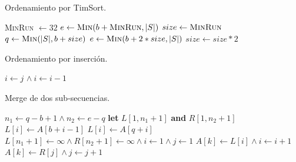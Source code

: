 \documentclass[letter]{article}
\begin{document}
\begin{algorithm}[!ht]
\caption{Ordenamiento por TimSort.}
\begin{algorithmic}[1]
  \State \textsc{MinRun} $\leftarrow 32$ 
    \State $e \leftarrow \Call{Min}{b + \textsc{MinRun}, |S|}$
    \State {}
  \EndFor
  \State $size \leftarrow \textsc{MinRun}$
      \State $q \leftarrow \Call{Min}{|S|, b+size}$
      \State $e \leftarrow \Call{Min}{b + 2 * size, |S|}$
        \State {}
      \EndIf
    \EndFor
    \State $size \leftarrow size * 2$
  \EndWhile
\EndProcedure
\end{algorithmic}
\end{algorithm}

\vspace{-1em}

\begin{algorithm}[!ht]
\caption{Ordenamiento por inserción.}
\begin{algorithmic}[1]
    \State $i \leftarrow j$
      \State {} $\land~ i \leftarrow i - 1$
    \EndWhile
  \EndFor
\EndProcedure
\end{algorithmic}
\end{algorithm}

\vspace{-1em}

\begin{algorithm}[!ht]
\caption{Merge de dos sub-secuencias.}
\begin{algorithmic}[1]
  \State $n_1 \leftarrow q - b + 1 \land n_2 \leftarrow e - q$
  \State \textbf{let} $L[1,n_1+1]$ \textbf{and} $R[1,n_2+1]$
    \State $L[i] \leftarrow A[b + i - 1]$
  \EndFor
    \State $L[i] \leftarrow A[q + i]$
  \EndFor
  \State $L[n_1+1] \leftarrow \infty \land R[n_2+1] \leftarrow \infty \land i \leftarrow 1 \land j \leftarrow 1$
      \State $A[k] \leftarrow L[i] \land i \leftarrow i + 1$
    \Else{}
      \State $A[k] \leftarrow R[j] \land j \leftarrow j + 1$ 
    \EndIf
  \EndFor
\EndProcedure
\end{algorithmic}
\end{algorithm}
\end{document}
